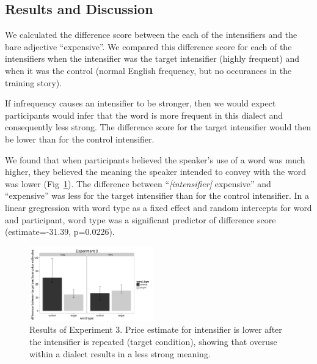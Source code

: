 \documentclass[10pt,letterpaper]{article}
\begin{document}
\subsection{Results and Discussion}

We calculated the difference score between the each of the intensifiers and the bare adjective ``expensive''.
We compared this difference score for each of the intensifiers when the intensifier was the target intensifier (highly frequent) and when it was the control (normal English frequency, but no occurances in the training story).

If infrequency causes an intensifier to be stronger, then we would expect participants would infer that the word is more frequent in this dialect and consequently less strong.
The difference score for the target intensifier would then be lower than for the control intensifier.


We found that when participants believed the speaker's use of a word was much higher, they believed the meaning the speaker intended to convey with the word was lower (Fig~\ref{exp3-price-plot}).
The difference between ``\emph{[intensifier]} expensive'' and ``expensive'' was less for the target intensifier than for the control intensifier.
In a linear gregression with word type as a fixed effect and random intercepts for word and participant, word type was a significant predictor of difference score (estimate=-31.39, p=0.0226).

\begin{figure}[ht]
\begin{center}
\includegraphics[width=0.48\textwidth]{analysis_files_for_writeup/images/exp3-price-plot.png}
\end{center}
\caption{Results of Experiment 3. Price estimate for intensifier is lower after the intensifier is repeated (target condition), showing that overuse within a dialect results in a less strong meaning.} 
\label{exp3-price-plot}
\end{figure}
\end{document}
